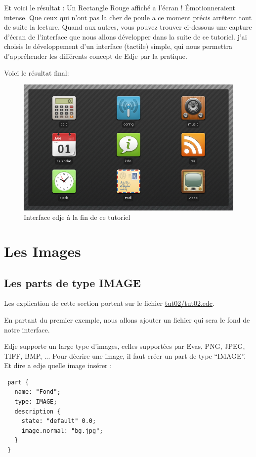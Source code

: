 \documentclass[a4paper]{efr}
\begin{document}
Et voici le résultat : Un Rectangle Rouge affiché a l'écran ! Émotionneraient
intense.
Que ceux qui n'ont pas la cher de poule a ce moment précis arrêtent tout de
suite la lecture. Quand aux autres, vous pouvez trouver ci-dessous une capture
d'écran de l'interface que nous allons développer dans la suite de ce tutoriel.
j'ai choisis le développement d'un interface (tactile) simple, qui nous
permettra d'appréhender les différents concept de Edje par la pratique.

Voici le résultat final:
\begin{figure}
  \begin{center}
    \includegraphics[scale=0.5]{images/screenshot1.png}
  \end{center}
  \caption{Interface edje à la fin de ce tutoriel}
\end{figure}

\section{Les Images}
\subsection{Les parts de type IMAGE}
Les explication de cette section portent sur le fichier
\href{file://tut02/tut02.edc}{tut02/tut02.edc}.

En partant du premier exemple, nous allons ajouter un fichier qui sera le fond
de notre interface.

Edje supporte un large type d'images, celles supportées par Evas,
PNG, JPEG, TIFF, BMP, ...
Pour décrire une image, il faut créer un part de type ``IMAGE''.
Et dire a edje quelle image insérer :

\begin{lstlisting}
 part {
   name: "Fond";
   type: IMAGE;
   description {
     state: "default" 0.0;
     image.normal: "bg.jpg";
   }
 }
\end{lstlisting}
\end{document}
